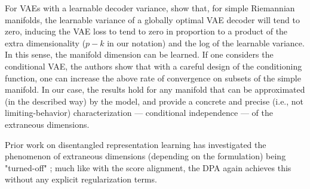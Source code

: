 For VAEs with a learnable decoder variance, \citet{zheng_learning_2022} show that, for simple Riemannian manifolds, the learnable variance of a globally optimal VAE decoder will tend to zero, inducing the VAE loss to tend to zero in proportion to a product of the extra dimensionality ($p-k$ in our notation) and the log of the learnable variance. In this sense, the manifold dimension can be learned. If one considers the conditional VAE, the authors show that with a careful design of the conditioning function, one can increase the above rate of convergence on subsets of the simple manifold. In our case, the results hold for any manifold that can be approximated (in the described way) by the model, and provide a concrete and precise (i.e., not limiting-behavior) characterization --- conditional independence --- of the extraneous dimensions.

Prior work on disentangled representation learning has investigated the phenomenon of extraneous dimensions (depending on the formulation) being "turned-off" \citep{higgins_beta-vae_2016, kim_disentangling_2019}; much like with the score alignment, the DPA again achieves this without any explicit regularization terms.